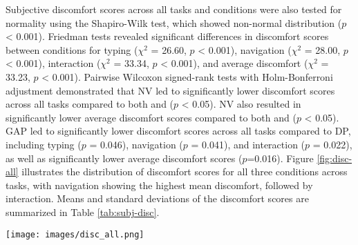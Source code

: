 
Subjective discomfort scores across all tasks and conditions were also tested for normality using the Shapiro-Wilk test, which showed non-normal distribution ($p$ < 0.001). Friedman tests revealed significant differences in discomfort scores between conditions for typing ($\chi^2$ = 26.60, $p$ < 0.001), navigation ($\chi^2$ = 28.00, $p$ < 0.001), interaction ($\chi^2$ = 33.34, $p$ < 0.001), and average discomfort ($\chi^2$ = 33.23, $p$ < 0.001). Pairwise Wilcoxon signed-rank tests with Holm-Bonferroni adjustment demonstrated that NV led to significantly lower discomfort scores across all tasks compared to both \DP and \GAP ($p$ < 0.05). NV also resulted in significantly lower average discomfort scores compared to both \DP and \GAP ($p$ < 0.05). GAP led to significantly lower discomfort scores across all tasks compared to DP, including typing ($p$ = 0.046), navigation ($p$ = 0.041), and interaction ($p$ = 0.022), as well as significantly lower average discomfort scores ($p$=0.016). Figure \ref{fig:disc-all} illustrates the distribution of discomfort scores for all three conditions across tasks, with navigation showing the highest mean discomfort, followed by interaction. Means and standard deviations of the discomfort scores are summarized in Table \ref{tab:subj-disc}.

\begin{figure*}[!ht]
  \centering
  \texttt{[image: images/disc\_all.png]}
  \caption{\textbf{Subjective Discomfort} Box plots of discomfort scores and preference for all conditions across the typing, navigation, and interaction tasks.  NV led to significantly lower discomfort scores than both \DP and \GAP (p < 0.05) across all tasks.  Compared to \DP, \GAP led to significantly lower discomfort scores across all tasks, i.e., typing (p = 0.046), navigation(p = 0.041), interaction (p = 0.022).}
  \label{fig:disc-all}
\end{figure*}

